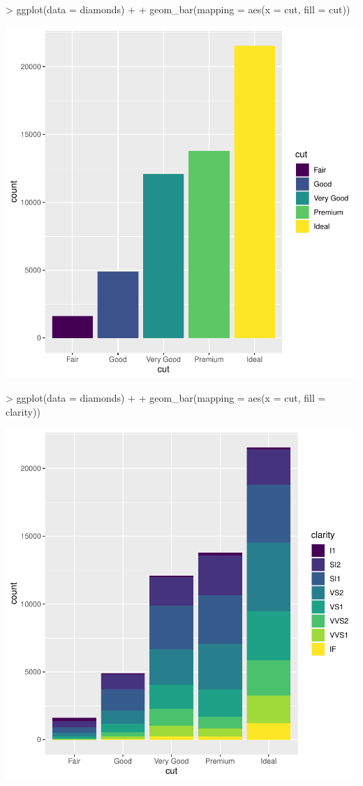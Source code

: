 \documentclass{article}
\begin{document}
\begin{Schunk}
\begin{Sinput}
> ggplot(data = diamonds) +
+ geom_bar(mapping = aes(x = cut, fill = cut))
\end{Sinput}
\end{Schunk}
\includegraphics{tidigg-009}
\begin{Schunk}
\begin{Sinput}
> ggplot(data = diamonds) +
+ geom_bar(mapping = aes(x = cut, fill = clarity))
\end{Sinput}
\end{Schunk}
\includegraphics{tidigg-010}
\end{document}
